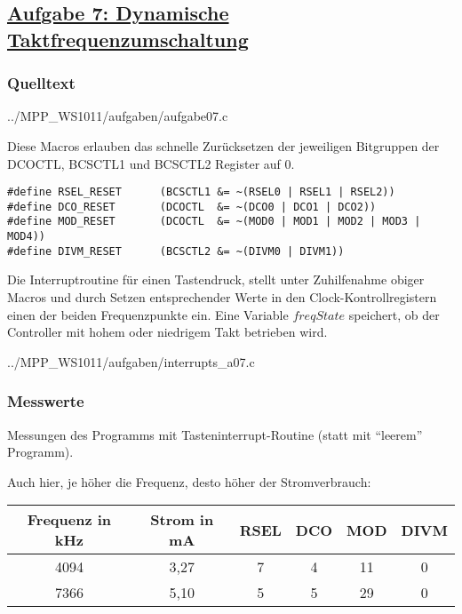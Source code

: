 \subsection
{\href{http://cst.mi.fu-berlin.de/intern/19606-P-MPP/Aufgaben/040203.html}
{Aufgabe 7: Dynamische Taktfrequenzumschaltung}}

\subsubsection*{Quelltext}


{../MPP_WS1011/aufgaben/aufgabe07.c}

Diese Macros erlauben das schnelle Zurücksetzen der jeweiligen Bitgruppen der DCOCTL, BCSCTL1 und BCSCTL2 Register auf 0.

\begin{lstlisting}[caption=Macros]
#define RSEL_RESET      (BCSCTL1 &= ~(RSEL0 | RSEL1 | RSEL2))
#define DCO_RESET       (DCOCTL  &= ~(DCO0 | DCO1 | DCO2))
#define MOD_RESET       (DCOCTL  &= ~(MOD0 | MOD1 | MOD2 | MOD3 | MOD4))
#define DIVM_RESET      (BCSCTL2 &= ~(DIVM0 | DIVM1))
\end{lstlisting}

Die Interruptroutine für einen Tastendruck, stellt unter Zuhilfenahme obiger Macros und durch Setzen entsprechender Werte in den Clock-Kontrollregistern einen der beiden Frequenzpunkte ein. Eine Variable $freqState$ speichert, ob der Controller mit hohem oder niedrigem Takt betrieben wird.


{../MPP_WS1011/aufgaben/interrupts_a07.c}

\subsubsection*{Messwerte}

Messungen des Programms mit Tasteninterrupt-Routine (statt mit ``leerem'' Programm).

Auch hier, je höher die Frequenz, desto höher der Stromverbrauch:

\begin{center}
\begin{tabular}{|c|c|c|c|c|c|}\hline
Frequenz in kHz & Strom in mA & RSEL & DCO & MOD & DIVM \\\hline
4094 & 3,27 & 7 & 4 & 11 & 0 \\\hline
7366 & 5,10 & 5 & 5 & 29 & 0 \\\hline
\end{tabular}
\end{center}